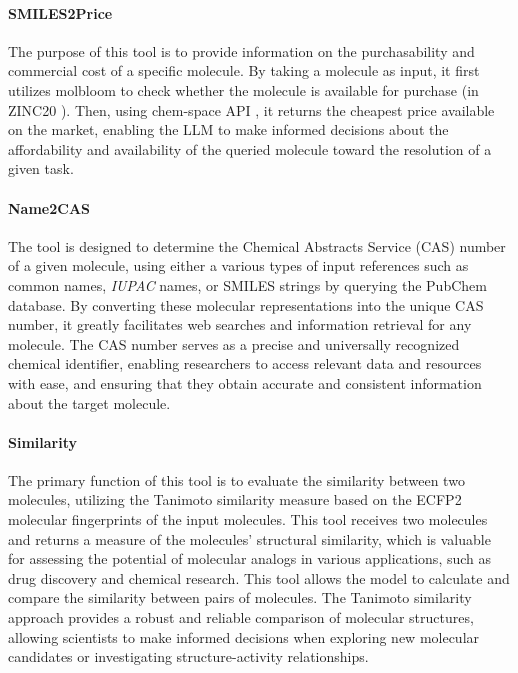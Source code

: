 \documentclass[10pt]{article}
\begin{document}
\paragraph{SMILES2Price}
The purpose of this tool is to provide information on the purchasability and commercial cost of a specific molecule. By taking a molecule as input, it first utilizes molbloom\cite{medina2023bloom} to check whether the molecule is available for purchase (in ZINC20 \cite{irwin2020zinc20}). Then, using chem-space API \cite{ChemSpace}, it returns the cheapest price available on the market, enabling the LLM to make informed decisions about the affordability and availability of the queried molecule toward the resolution of a given task. 


\paragraph{Name2CAS}
The tool is designed to determine the Chemical Abstracts Service (CAS) number of a given molecule, using either a various types of input references such as common names, \textit{IUPAC} names, or SMILES strings by querying the PubChem\cite{pubchem} database. By converting these molecular representations into the unique CAS number, it greatly facilitates web searches and information retrieval for any molecule. The CAS number serves as a precise and universally recognized chemical identifier, enabling researchers to access relevant data and resources with ease, and ensuring that they obtain accurate and consistent information about the target molecule\cite{cas}. 

\paragraph{Similarity} 
The primary function of this tool is to evaluate the similarity between two molecules, utilizing the Tanimoto similarity measure\cite{tt1958elementary} based on the ECFP2 molecular fingerprints\cite{rogers2010extended} of the input molecules. This tool receives two molecules and returns a measure of the molecules' structural similarity, which is valuable for assessing the potential of molecular analogs in various applications, such as drug discovery and chemical research. This tool allows the model to calculate and compare the similarity between pairs of molecules. The Tanimoto similarity approach provides a robust and reliable comparison of molecular structures, allowing scientists to make informed decisions when exploring new molecular candidates or investigating structure-activity relationships.
\end{document}
